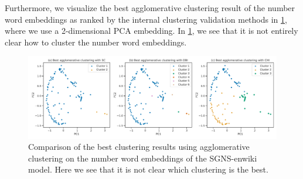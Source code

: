 Furthermore, we visualize the best agglomerative clustering result of the number word embeddings as ranked by the internal clustering validation methods in \cref{fig:cluster-analysis-agglomerative-numbers-word-group-internal-cluster-validation-best-2d-pca}, where we use a 2-dimensional PCA embedding. In \cref{fig:cluster-analysis-agglomerative-numbers-word-group-internal-cluster-validation-best-2d-pca}, we see that it is not entirely clear how to cluster the number word embeddings.
\begin{figure}[H]
    \centering
    \includegraphics[width=\textwidth]{thesis/figures/cluster-analysis-agglomerative-numbers-word-group-internal-cluster-validation-best-2d-pca.pdf}
    \caption{Comparison of the best clustering results using agglomerative clustering on the number word embeddings of the SGNS-enwiki model. Here we see that it is not clear which clustering is the best.}
    \label{fig:cluster-analysis-agglomerative-numbers-word-group-internal-cluster-validation-best-2d-pca}
\end{figure}

